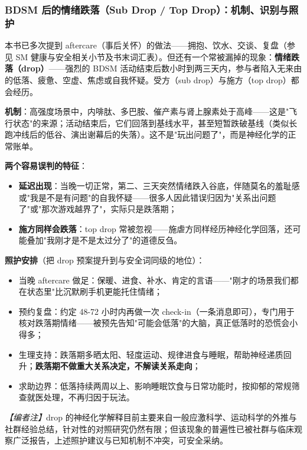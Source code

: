 \subsubsection{BDSM 后的情绪跌落（Sub Drop / Top Drop）：机制、识别与照护}

本书已多次提到 aftercare（事后关怀）的做法——拥抱、饮水、交谈、复盘（参见 SM 健康与安全相关小节及书末词汇表）。但还有一个常被漏掉的现象：\textbf{情绪跌落（drop）}——强烈的 BDSM 活动结束后数小时到两三天内，参与者陷入无来由的低落、疲惫、空虚、焦虑或自我怀疑。受方（sub drop）与施方（top drop）都会经历。

\textbf{机制}：高强度场景中，内啡肽、多巴胺、催产素与肾上腺素处于高峰——这是"飞行状态"的来源；活动结束后，它们回落到基线水平，甚至短暂跌破基线（类似长跑冲线后的低谷、演出谢幕后的失落）。这不是"玩出问题了"，而是神经化学的正常账单。

\textbf{两个容易误判的特征}：
\begin{itemize}
\item \textbf{延迟出现}：当晚一切正常，第二、三天突然情绪跌入谷底，伴随莫名的羞耻感或"我是不是有问题"的自我怀疑——很多人因此错误归因为"关系出问题了"或"那次游戏越界了"，实际只是跌落期；
\item \textbf{施方同样会跌落}：top drop 常被忽视——施虐方同样经历神经化学回落，还可能叠加"我刚才是不是太过分了"的道德反刍。
\end{itemize}

\textbf{照护安排}（把 drop 预案提升到与安全词同级的地位）：
\begin{itemize}
\item 当晚 aftercare 做足：保暖、进食、补水、肯定的言语——"刚才的场景我们都在状态里"比沉默刷手机更能托住情绪；
\item 预约复盘：约定 48-72 小时内再做一次 check-in（一条消息即可），专门用于核对跌落期情绪——被预先告知"可能会低落"的大脑，真正低落时的恐慌会小得多；
\item 生理支持：跌落期多晒太阳、轻度运动、规律进食与睡眠，帮助神经递质回升；\textbf{跌落期不做重大关系决定，不解读关系走向}；
\item 求助边界：低落持续两周以上、影响睡眠饮食与日常功能时，按抑郁的常规筛查就医处理，不再归因于玩法。
\end{itemize}

\noindent\textit{【编者注】}drop 的神经化学解释目前主要来自一般应激科学、运动科学的外推与社群经验总结，针对性的对照研究仍然有限；但该现象的普遍性已被社群与临床观察广泛报告，上述照护建议与已知机制不冲突，可安全采纳。
